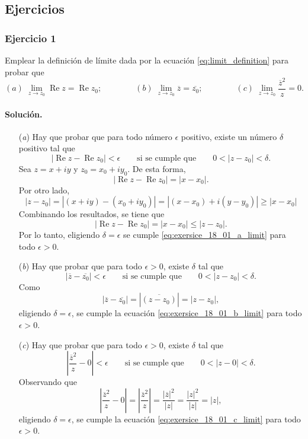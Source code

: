 \documentclass[a4paper]{report}
\renewcommand{\Re}{\operatorname{Re}}
\begin{document}
\subsection*{Ejercicios}

\subsubsection{Ejercicio 1}

Emplear la definición de límite dada por la ecuación \ref{eq:limit_definition} para probar que 
\[
 (\textit{a})\;\lim_{z\to z_0}\Re z=\Re z_0;\qquad\qquad 
 (\textit{b})\;\lim_{z\to z_0}\overline{z}=\overline{z_0};\qquad\qquad
 (\textit{c})\;\lim_{z\to z_0}\frac{\overline{z}^2}{z}=0.
\]

\paragraph{Solución.} 
\begin{enumerate}
 \item[(\textit{a})] Hay que probar que para todo número \(\epsilon\) positivo, existe un número \(\delta\) positivo tal que 
\begin{equation}\label{eq:exersice_18_01_a_limit}
 |\Re z-\Re z_0|<\epsilon
 \qquad\textrm{si se cumple que}\qquad
 0<|z-z_0|<\delta.
\end{equation}
Sea \(z=x+iy\) y \(z_0=x_0+iy_0\). De esta forma,
\[
 |\Re z-\Re z_0|=|x-x_0|.
\]
Por otro lado,
\[
 |z-z_0|=|(x+iy)-(x_0+iy_0)|=|(x-x_0)+i(y-y_0)|\geq|x-x_0|
\]
Combinando los resultados, se tiene que 
\[
 |\Re z-\Re z_0|=|x-x_0|\leq|z-z_0|.
\]
Por lo tanto, eligiendo \(\delta=\epsilon\) se cumple \ref{eq:exersice_18_01_a_limit} para todo \(\epsilon>0\).
\item[(\textit{b})] Hay que probar que para todo \(\epsilon>0\), existe \(\delta\) tal que
\begin{equation}\label{eq:exersice_18_01_b_limit}
 |\overline{z}-\overline{z_0}|<\epsilon
 \qquad\textrm{si se cumple que}\qquad
 0<|z-z_0|<\delta.
\end{equation}
Como 
\[
 |\overline{z}-\overline{z_0}|=|\overline{(z-z_0)}|=|z-z_0|,
\]
eligiendo \(\delta=\epsilon\), se cumple la ecuación \ref{eq:exersice_18_01_b_limit} para todo \(\epsilon>0\).
\item[(\textit{c})] Hay que probar que para todo \(\epsilon>0\), existe \(\delta\) tal que
\begin{equation}\label{eq:exersice_18_01_c_limit}
 \left|\frac{\overline{z}^2}{z}-0\right|<\epsilon
 \qquad\textrm{si se cumple que}\qquad
 0<|z-0|<\delta.
\end{equation}
Observando que 
\[
 \left|\frac{\overline{z}^2}{z}-0\right|=\left|\frac{\overline{z}^2}{z}\right|=\frac{|\overline{z}|^2}{|z|}=\frac{|z|^2}{|z|}=|z|,
\]
eligiendo \(\delta=\epsilon\), se cumple la ecuación \ref{eq:exersice_18_01_c_limit} para todo \(\epsilon>0\).
\end{enumerate}
\end{document}
